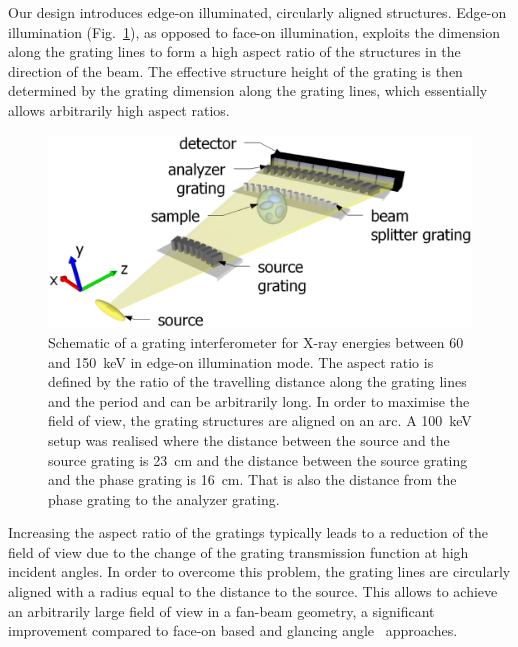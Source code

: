 \documentclass[english]{nature}
\begin{document}
Our design introduces edge-on illuminated,  circularly aligned structures. Edge-on illumination
(Fig.~\ref{Fig:schematic}), as
opposed to face-on illumination, exploits the dimension along the grating
lines to form a high aspect ratio of the structures in the direction of the beam. The
effective structure height of the grating is then determined by the grating
dimension along the grating lines, which essentially allows arbitrarily high
aspect ratios. 
\begin{figure}[h!]
    \centering
    \includegraphics[width=.7\textwidth]{figures/figure1.eps}
    \caption{Schematic of a grating
        interferometer for X-ray energies between 60 and
        \SI{150}{\kilo\electronvolt} in edge-on illumination mode. The
        aspect ratio is defined by the ratio of the travelling distance along the
        grating lines and the period and can be arbitrarily long. In order to maximise
        the field of view, the grating structures are aligned on an
        arc. A \SI{100}{\kilo\eV} setup was realised where the distance
        between the source and the source grating is \SI{23}{\centi\metre}
    and the distance between the source grating and the phase grating is
    \SI{16}{\centi\metre}. That is also the distance from the phase grating
to the analyzer grating.}%
\label{Fig:schematic}
\end{figure}

Increasing the aspect ratio of the gratings typically leads to a
reduction of the field of view due to the change of the grating transmission
function at high incident angles. In order to overcome this problem, the grating lines are circularly aligned 
with a radius equal to the distance to the source. 
This allows to achieve an arbitrarily large field of view in a fan-beam
geometry, a significant improvement compared to face-on based and glancing
angle~\cite{Stutman2012a} approaches.
\end{document}
